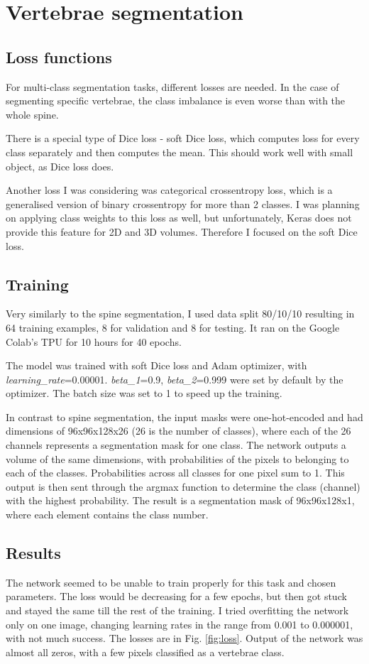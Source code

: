 \section{Vertebrae segmentation}
\subsection{Loss functions}
For multi-class segmentation tasks, different losses are needed. In the case of segmenting specific vertebrae,  the class imbalance is even worse than with the whole spine. 

There is a special type of Dice loss - soft Dice loss, which computes loss for every class separately and then computes the mean. This should work well with small object, as Dice loss does. 

Another loss I was considering was categorical crossentropy loss, which is a generalised version of binary crossentropy for more than 2 classes. I was planning on applying class weights to this loss as well, but unfortunately, Keras does not provide this feature for 2D and 3D volumes. Therefore I focused on the soft Dice loss.

\subsection{Training}
Very similarly to the spine segmentation, I used data split 80/10/10 resulting in 64 training examples, 8 for validation and 8 for testing. It ran on the Google Colab's TPU for 10 hours for 40 epochs. 

The model was trained with soft Dice loss and Adam optimizer, with \textit{learning\_rate}=0.00001. \textit{beta\_1}=0.9, \textit{beta\_2}=0.999 were set by default by the optimizer. The batch size was set to 1 to speed up the training.

In contrast to spine segmentation, the input masks were one-hot-encoded and had dimensions of 96x96x128x26 (26 is the number of classes), where each of the 26 channels represents a segmentation mask for one class. The network outputs a volume of the same dimensions, with probabilities of the pixels to belonging to each of the classes. Probabilities across all classes for one pixel sum to 1. This output is then sent through the argmax function to determine the class (channel) with the highest probability. The result is a segmentation mask of 96x96x128x1, where each element contains the class number. 

\subsection{Results}
The network seemed to be unable to train properly for this task and chosen parameters. The loss would be decreasing for a few epochs, but then got stuck and stayed the same till the rest of the training. I tried overfitting the network only on one image, changing learning rates in the range from 0.001 to 0.000001, with not much success. The losses are in Fig. \ref{fig:loss}. Output of the network was almost all zeros, with a few pixels classified as a vertebrae class. 

